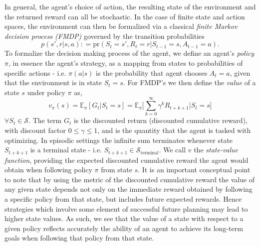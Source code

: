 \documentclass[twocolumn,preprintnumbers,amsmath,amssymb,notitlepage,nofootinbib,longbibliography,superscriptaddress,aps,pra,10pt]{revtex4-1}
\newcommand{\defeq}{\mathrel{\mathop:}=}
\begin{document}
	In general, the agent's choice of action, the resulting state of the environment and the returned reward can all be stochastic.
	In the case of finite state and action spaces, the environment can then be formalized via a  classical  \emph{finite Markov decision process (FMDP)} governed by the transition probabilities
	\begin{equation}
		p(s',r|s,a) \defeq \mathrm{pr}(S_t = s',R_t = r|S_{t-1} = s, A_{t-1} = a).
	\end{equation}
	To formalize the decision making process of the agent, we define an agent's \textit{policy} $\pi$, in essence the agent's strategy, as a mapping from states to probabilities of specific actions - i.e. $\pi(a|s)$ is the probability that agent chooses $A_t = a$, given that the environment is in state $S_t = s$.
	For FMDP's we then define the \textit{value} of a state $s$ under policy $\pi$ as,
	\begin{equation}
		v_{\pi}(s) = \mathbb{E}_{\pi}[G_t|S_t = s]  = \mathbb{E}_{\pi} \Big[\sum_{k = 0}^{\infty}\gamma^k R_{t+k+1}\Big| S_t = s \Big] 
	\end{equation}
	$\forall S_t \in \mathcal{S}$.
	The term $G_t$ is the discounted return (discounted cumulative reward), with discount factor $0 \leq \gamma \leq 1$, and is the quantity that the agent is tasked with optimizing.
	In episodic settings the infinite sum terminates whenever state $S_{t+k+1}$ is a terminal state - i.e. $S_{t+k+1} \in \mathcal{S}_{\mathrm{terminal}}$.
	We call $v$ the \textit{state-value function}, providing the expected discounted cumulative reward the agent would obtain when following policy $\pi$ from state $s$.
	It is an important conceptual point to note that by using the metric of the discounted cumulative reward the value of any given state depends not only on the immediate reward obtained by following a specific policy from that state, but includes future expected rewards.
	Hence strategies which involve some element of successful future planning may lead to higher state values.
	As such, we see that the value of a state with respect to a given policy reflects accurately the ability of an agent to achieve its long-term goals when following that policy from that state.
\end{document}
